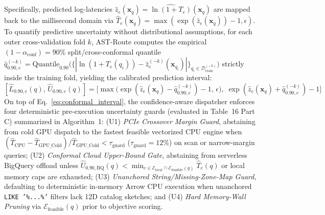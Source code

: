 \documentclass[10pt,a4paper]{article}
\begin{document}
Specifically, predicted log-latencies $\hat{z}_e(\mathbf{x}_q) = \widehat{\ln(1+T_e)}(\mathbf{x}_q)$ are mapped back to the millisecond domain via $\hat{T}_e(\mathbf{x}_q) = \max(\exp(\hat{z}_e(\mathbf{x}_q)) - 1, \epsilon)$. To quantify predictive uncertainty without distributional assumptions, for each outer cross-validation fold $k$, AST-Route computes the empirical $(1-\alpha_{\text{conf}})=90\%$ split/cross-conformal quantile $\hat{q}_{0.90,e}^{(-k)} = \text{Quantile}_{0.90}\big(\{|\ln(1+T_e(q_i)) - \hat{z}_e^{(-k)}(\mathbf{x}_{q_i})|\}_{q_i \in \mathcal{D}_{\text{train}}^{(-k)}}\big)$ strictly inside the training fold, yielding the calibrated prediction interval:
\begin{equation}\label{eq:conformal_interval}
[\hat{L}_{0.90,e}(q),\, \hat{U}_{0.90,e}(q)] = \Big[\max\!\big(\exp(\hat{z}_e(\mathbf{x}_q) - \hat{q}_{0.90,e}^{(-k)}) - 1,\, \epsilon\big),\; \exp(\hat{z}_e(\mathbf{x}_q) + \hat{q}_{0.90,e}^{(-k)}) - 1\Big]
\end{equation}
On top of Eq.~\eqref{eq:conformal_interval}, the confidence-aware dispatcher enforces four deterministic pre-execution uncertainty guards (evaluated in Table~16 Part C) summarized in Algorithm~1: (U1) \emph{PCIe Crossover Margin Guard}, abstaining from cold GPU dispatch to the fastest feasible vectorized CPU engine when $(\hat{T}_{\text{CPU}} - \hat{T}_{\text{GPU\_Cold}})/\hat{T}_{\text{GPU\_Cold}} < \tau_{\text{guard}}$ ($\tau_{\text{guard}}=12\%$) on scan or narrow-margin queries; (U2) \emph{Conformal Cloud Upper-Bound Gate}, abstaining from serverless BigQuery offload unless $\hat{U}_{0.90,\text{BQ}}(q) < \min_{e \in \mathcal{E}_{\text{local}}\cap\mathcal{E}_{\text{feasible}}(q)} \hat{T}_e(q)$ or local memory caps are exhausted; (U3) \emph{Unanchored String/Missing-Zone-Map Guard}, defaulting to deterministic in-memory Arrow CPU execution when unanchored \texttt{LIKE '\%...\%'} filters lack 12D catalog sketches; and (U4) \emph{Hard Memory-Wall Pruning} via $\mathcal{E}_{\text{feasible}}(q)$ prior to objective scoring.
\end{document}
